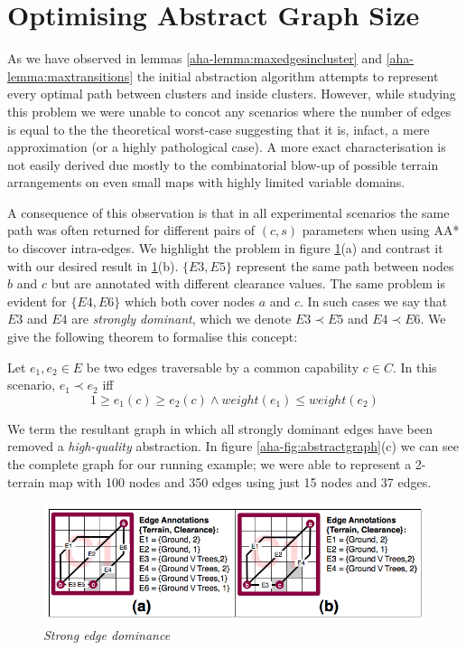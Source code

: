 \section{Optimising Abstract Graph Size}
\par \indent
As we have observed in lemmas \ref{aha-lemma:maxedgesincluster} and \ref{aha-lemma:maxtransitions} the initial abstraction algorithm attempts to represent every optimal path between clusters and inside clusters. However, while studying this problem we were unable to concot any scenarios where the number of edges is equal to the the theoretical worst-case suggesting that it is, infact, a mere approximation (or a highly pathological case).  A more exact characterisation is not easily derived due mostly to the combinatorial blow-up of possible terrain arrangements on even small maps with highly limited variable domains.
\par \indent 
A consequence of this observation is that in all experimental scenarios the same path was often returned for different pairs of $(c, s)$ parameters when using AA* to discover intra-edges. We highlight the problem in figure \ref{aha-fig:strongdominance}(a) and contrast it with our desired result in \ref{aha-fig:strongdominance}(b). $\lbrace E3, E5 \rbrace$ represent the same path between nodes $b$ and $c$ but are annotated with different clearance values. The same problem is evident for $\lbrace E4, E6 \rbrace$ which both cover nodes $a$ and $c$. In such cases we say that $E3$ and $E4$ are \emph{strongly dominant}, which we denote $E3 \prec E5$ and $E4 \prec E6$. We give the following theorem to formalise this concept:

\begin{theorem}
\label{aha-theorem:strongdominance}
Let $e_{1}, e_{2} \in E$ be two edges traversable by a common capability $c \in C$. In this scenario, $e_{1} \prec e_{2}$ iff
$$ 1 \geq e_{1}(c) \geq e_{2}(c) \wedge weight(e_{1}) \leq weight(e_{2})$$
\end{theorem}

We term the resultant graph in which all strongly dominant edges have been removed a \emph{high-quality} abstraction. 
In figure \ref{aha-fig:abstractgraph}(c) we can see the complete graph for our running example; we were able to represent a 2-terrain map with 100 nodes and 350 edges using just 15 nodes and  37 edges. 

\begin{figure}[htbp]
        \caption{\emph{Strong edge dominance} }
        \begin{center}
                        \includegraphics[scale=0.3]{diagrams/intraedges_initial.png}
        \end{center}
        \label{aha-fig:strongdominance}
\end{figure}

